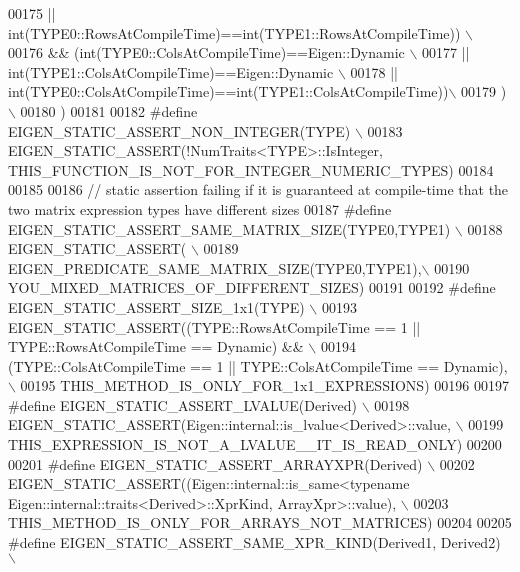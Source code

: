 \begin{DoxyCode}
00175 \textcolor{preprocessor}{        || int(TYPE0::RowsAtCompileTime)==int(TYPE1::RowsAtCompileTime)) \(\backslash\)}
00176 \textcolor{preprocessor}{      &&  (int(TYPE0::ColsAtCompileTime)==Eigen::Dynamic \(\backslash\)}
00177 \textcolor{preprocessor}{        || int(TYPE1::ColsAtCompileTime)==Eigen::Dynamic \(\backslash\)}
00178 \textcolor{preprocessor}{        || int(TYPE0::ColsAtCompileTime)==int(TYPE1::ColsAtCompileTime))\(\backslash\)}
00179 \textcolor{preprocessor}{       ) \(\backslash\)}
00180 \textcolor{preprocessor}{     )}
00181 
00182 \textcolor{preprocessor}{#define EIGEN\_STATIC\_ASSERT\_NON\_INTEGER(TYPE) \(\backslash\)}
00183 \textcolor{preprocessor}{    EIGEN\_STATIC\_ASSERT(!NumTraits<TYPE>::IsInteger, THIS\_FUNCTION\_IS\_NOT\_FOR\_INTEGER\_NUMERIC\_TYPES)}
00184 
00185 
00186 \textcolor{comment}{// static assertion failing if it is guaranteed at compile-time that the two matrix expression types have
       different sizes}
00187 \textcolor{preprocessor}{#define EIGEN\_STATIC\_ASSERT\_SAME\_MATRIX\_SIZE(TYPE0,TYPE1) \(\backslash\)}
00188 \textcolor{preprocessor}{  EIGEN\_STATIC\_ASSERT( \(\backslash\)}
00189 \textcolor{preprocessor}{     EIGEN\_PREDICATE\_SAME\_MATRIX\_SIZE(TYPE0,TYPE1),\(\backslash\)}
00190 \textcolor{preprocessor}{    YOU\_MIXED\_MATRICES\_OF\_DIFFERENT\_SIZES)}
00191 
00192 \textcolor{preprocessor}{#define EIGEN\_STATIC\_ASSERT\_SIZE\_1x1(TYPE) \(\backslash\)}
00193 \textcolor{preprocessor}{      EIGEN\_STATIC\_ASSERT((TYPE::RowsAtCompileTime == 1 || TYPE::RowsAtCompileTime == Dynamic) && \(\backslash\)}
00194 \textcolor{preprocessor}{                          (TYPE::ColsAtCompileTime == 1 || TYPE::ColsAtCompileTime == Dynamic), \(\backslash\)}
00195 \textcolor{preprocessor}{                          THIS\_METHOD\_IS\_ONLY\_FOR\_1x1\_EXPRESSIONS)}
00196 
00197 \textcolor{preprocessor}{#define EIGEN\_STATIC\_ASSERT\_LVALUE(Derived) \(\backslash\)}
00198 \textcolor{preprocessor}{      EIGEN\_STATIC\_ASSERT(Eigen::internal::is\_lvalue<Derived>::value, \(\backslash\)}
00199 \textcolor{preprocessor}{                          THIS\_EXPRESSION\_IS\_NOT\_A\_LVALUE\_\_IT\_IS\_READ\_ONLY)}
00200 
00201 \textcolor{preprocessor}{#define EIGEN\_STATIC\_ASSERT\_ARRAYXPR(Derived) \(\backslash\)}
00202 \textcolor{preprocessor}{      EIGEN\_STATIC\_ASSERT((Eigen::internal::is\_same<typename Eigen::internal::traits<Derived>::XprKind,
       ArrayXpr>::value), \(\backslash\)}
00203 \textcolor{preprocessor}{                          THIS\_METHOD\_IS\_ONLY\_FOR\_ARRAYS\_NOT\_MATRICES)}
00204 
00205 \textcolor{preprocessor}{#define EIGEN\_STATIC\_ASSERT\_SAME\_XPR\_KIND(Derived1, Derived2) \(\backslash\)}

\end{DoxyCode}
